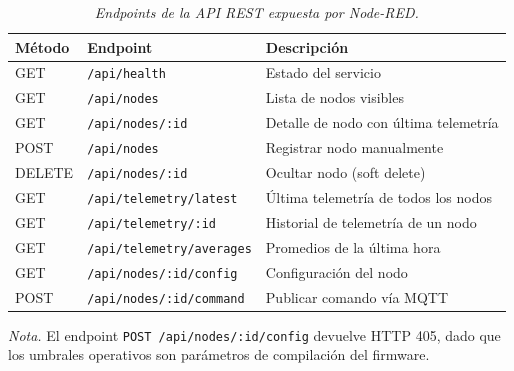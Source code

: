 \begin{table}[htbp]
  \caption{\textit{Endpoints de la API REST expuesta por Node-RED.}}
  \label{tab:api_endpoints}
  \centering
  \small
  \begin{tabularx}{\textwidth}{@{}llX@{}}
    \toprule
    \textbf{Método} & \textbf{Endpoint} & \textbf{Descripción} \\
    \midrule
    GET  & \texttt{/api/health}                     & Estado del servicio \\
    GET  & \texttt{/api/nodes}                      & Lista de nodos visibles \\
    GET  & \texttt{/api/nodes/:id}                  & Detalle de nodo con última telemetría \\
    POST & \texttt{/api/nodes}                      & Registrar nodo manualmente \\
    DELETE & \texttt{/api/nodes/:id}                & Ocultar nodo (soft delete) \\
    GET  & \texttt{/api/telemetry/latest}           & Última telemetría de todos los nodos \\
    GET  & \texttt{/api/telemetry/:id}              & Historial de telemetría de un nodo \\
    GET  & \texttt{/api/telemetry/averages}         & Promedios de la última hora \\
    GET  & \texttt{/api/nodes/:id/config}           & Configuración del nodo \\
    POST & \texttt{/api/nodes/:id/command}          & Publicar comando vía MQTT \\
    \bottomrule
  \end{tabularx}
  \vspace{4pt}

  \noindent\textit{Nota.} El endpoint \texttt{POST /api/nodes/:id/config} devuelve
  HTTP 405, dado que los umbrales operativos son parámetros de compilación del firmware.
\end{table}

